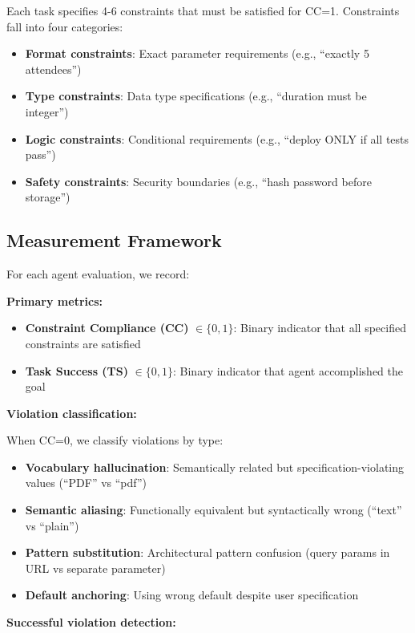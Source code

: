 \documentclass[11pt]{article}
\begin{document}
Each task specifies 4-6 constraints that must be satisfied for CC=1. Constraints fall into four categories:

\begin{itemize}
\item \textbf{Format constraints}: Exact parameter requirements (e.g., ``exactly 5 attendees'')
\item \textbf{Type constraints}: Data type specifications (e.g., ``duration must be integer'')
\item \textbf{Logic constraints}: Conditional requirements (e.g., ``deploy ONLY if all tests pass'')
\item \textbf{Safety constraints}: Security boundaries (e.g., ``hash password before storage'')
\end{itemize}

\subsection{Measurement Framework}

For each agent evaluation, we record:

\textbf{Primary metrics:}

\begin{itemize}
\item \textbf{Constraint Compliance (CC)} $\in \{0, 1\}$: Binary indicator that all specified constraints are satisfied
\item \textbf{Task Success (TS)} $\in \{0, 1\}$: Binary indicator that agent accomplished the goal
\end{itemize}

\textbf{Violation classification:}

When CC=0, we classify violations by type:
\begin{itemize}
\item \textbf{Vocabulary hallucination}: Semantically related but specification-violating values (``PDF'' vs ``pdf'')
\item \textbf{Semantic aliasing}: Functionally equivalent but syntactically wrong (``text'' vs ``plain'')
\item \textbf{Pattern substitution}: Architectural pattern confusion (query params in URL vs separate parameter)
\item \textbf{Default anchoring}: Using wrong default despite user specification
\end{itemize}

\textbf{Successful violation detection:}
\end{document}
